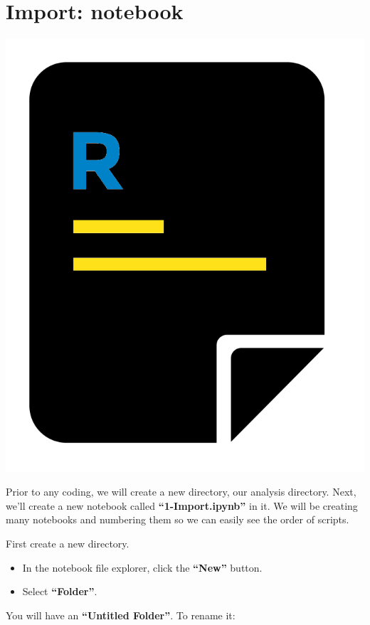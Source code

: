 \documentclass[
]{book}
\providecommand{\tightlist}{%
  \setlength{\itemsep}{0pt}\setlength{\parskip}{0pt}}
\begin{document}
\hypertarget{import-notebook}{%
\section{Import: notebook}\label{import-notebook}}

\includegraphics{figures/r_script.png}

Prior to any coding, we will create a new directory, our analysis directory.
Next, we'll create a new notebook called \textbf{``1-Import.ipynb''} in it.
We will be creating many notebooks and numbering them so we can easily see the order of scripts.

First create a new directory.

\begin{itemize}
\tightlist
\item
  In the notebook file explorer, click the \textbf{``New''} button.
\item
  Select \textbf{``Folder''}.
\end{itemize}

You will have an \textbf{``Untitled Folder''}. To rename it:
\end{document}
